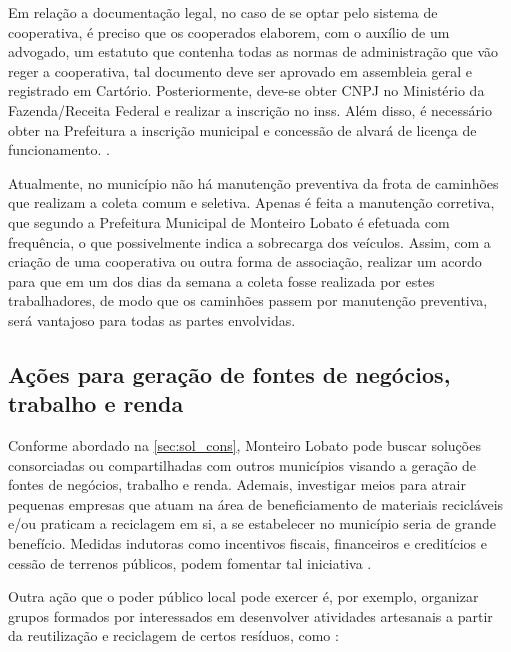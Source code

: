 Em relação a documentação legal, no caso de se optar pelo sistema de cooperativa, é preciso que os cooperados elaborem, com o auxílio de um advogado, um estatuto que contenha todas as normas de administração que vão reger a cooperativa, tal documento deve ser aprovado em assembleia geral e registrado em Cartório. Posteriormente, deve-se obter CNPJ no Ministério da Fazenda/Receita Federal e realizar a inscrição no \gls{inss}. Além disso, é necessário obter na Prefeitura a inscrição municipal e concessão de alvará de licença de funcionamento. \cite{cooper_sebrae}. 

Atualmente, no município não há manutenção preventiva da frota de caminhões que realizam a coleta comum e seletiva. Apenas é feita a manutenção corretiva, que segundo a Prefeitura Municipal de Monteiro Lobato é efetuada com frequência, o que possivelmente indica a sobrecarga dos veículos. Assim, com a criação de uma cooperativa ou outra forma de associação, realizar um acordo para que em um dos dias da semana a coleta fosse realizada por estes trabalhadores, de modo que os caminhões passem por manutenção preventiva, será vantajoso para todas as partes envolvidas.   

\subsection{Ações para geração de fontes de negócios, trabalho e renda}

Conforme abordado na \autoref{sec:sol_cons}, Monteiro Lobato pode buscar soluções consorciadas ou compartilhadas com outros municípios visando a geração de fontes de negócios, trabalho e renda. Ademais, investigar meios para atrair pequenas empresas que atuam na área de beneficiamento de materiais recicláveis e/ou praticam a reciclagem em si, a se estabelecer no município seria de grande benefício. Medidas indutoras como incentivos fiscais, financeiros e creditícios e cessão de terrenos públicos, podem fomentar tal iniciativa \cite{agevap_manual_2019}. 

Outra ação que o poder público local pode exercer é, por exemplo, organizar grupos formados por interessados em desenvolver atividades artesanais a partir da reutilização e reciclagem de certos resíduos, como \cite{pmgirs_lagoinha_2017}:


